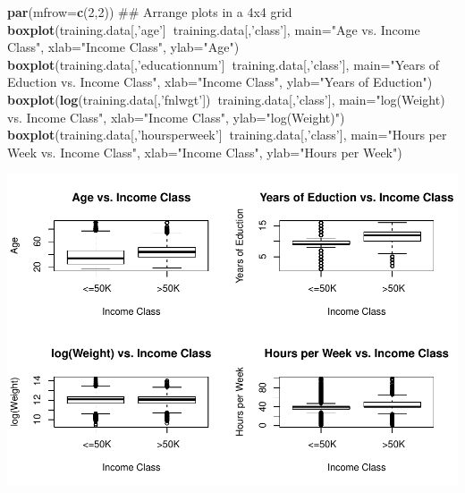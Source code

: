\documentclass[]{article}
\newenvironment{Shaded}{\begin{snugshade}}{\end{snugshade}}
\newcommand{\KeywordTok}[1]{\textcolor[rgb]{0.13,0.29,0.53}{\textbf{#1}}}
\newcommand{\DataTypeTok}[1]{\textcolor[rgb]{0.13,0.29,0.53}{#1}}
\newcommand{\DecValTok}[1]{\textcolor[rgb]{0.00,0.00,0.81}{#1}}
\newcommand{\StringTok}[1]{\textcolor[rgb]{0.31,0.60,0.02}{#1}}
\newcommand{\OperatorTok}[1]{\textcolor[rgb]{0.81,0.36,0.00}{\textbf{#1}}}
\newcommand{\NormalTok}[1]{#1}
\begin{document}
\begin{Shaded}
\begin{Highlighting}[]
\KeywordTok{par}\NormalTok{(}\DataTypeTok{mfrow=}\KeywordTok{c}\NormalTok{(}\DecValTok{2}\NormalTok{,}\DecValTok{2}\NormalTok{))  ## Arrange plots in a 4x4 grid}
\KeywordTok{boxplot}\NormalTok{(training.data[,}\StringTok{'age'}\NormalTok{]}\OperatorTok{~}\NormalTok{training.data[,}\StringTok{'class'}\NormalTok{], }\DataTypeTok{main=}\StringTok{"Age vs. Income Class"}\NormalTok{, }
        \DataTypeTok{xlab=}\StringTok{"Income Class"}\NormalTok{, }\DataTypeTok{ylab=}\StringTok{"Age"}\NormalTok{)}
\KeywordTok{boxplot}\NormalTok{(training.data[,}\StringTok{'educationnum'}\NormalTok{]}\OperatorTok{~}\NormalTok{training.data[,}\StringTok{'class'}\NormalTok{], }\DataTypeTok{main=}\StringTok{"Years of Eduction vs. Income Class"}\NormalTok{, }
        \DataTypeTok{xlab=}\StringTok{"Income Class"}\NormalTok{, }\DataTypeTok{ylab=}\StringTok{"Years of Eduction"}\NormalTok{)}
\KeywordTok{boxplot}\NormalTok{(}\KeywordTok{log}\NormalTok{(training.data[,}\StringTok{'fnlwgt'}\NormalTok{])}\OperatorTok{~}\NormalTok{training.data[,}\StringTok{'class'}\NormalTok{], }\DataTypeTok{main=}\StringTok{"log(Weight) vs. Income Class"}\NormalTok{, }
        \DataTypeTok{xlab=}\StringTok{"Income Class"}\NormalTok{, }\DataTypeTok{ylab=}\StringTok{"log(Weight)"}\NormalTok{)}
\KeywordTok{boxplot}\NormalTok{(training.data[,}\StringTok{'hoursperweek'}\NormalTok{]}\OperatorTok{~}\NormalTok{training.data[,}\StringTok{'class'}\NormalTok{], }\DataTypeTok{main=}\StringTok{"Hours per Week vs. Income Class"}\NormalTok{, }
        \DataTypeTok{xlab=}\StringTok{"Income Class"}\NormalTok{, }\DataTypeTok{ylab=}\StringTok{"Hours per Week"}\NormalTok{)}
\end{Highlighting}
\end{Shaded}

\includegraphics{post1_files/figure-latex/numerical data distribution in two groups-1.pdf}
\end{document}

